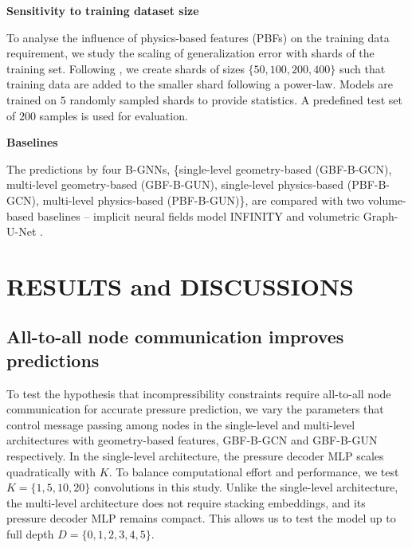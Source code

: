 \documentclass{marine_2025_paper_template}
\begin{document}
\noindent
\textbf{Sensitivity to training dataset size}

To analyse the influence of physics-based features (PBFs) on the training data requirement, we study the scaling of generalization error with shards of the training set. Following \cite{hestness2017}, we create shards of sizes $\{50, 100, 200, 400\}$ such that training data are added to the smaller shard following a power-law. Models are trained on $5$ randomly sampled shards to provide statistics. A predefined test set of $200$ samples is used for evaluation. \newline

\noindent\textbf{Baselines}

The predictions by four B-GNNs, \{single-level geometry-based (GBF-B-GCN), multi-level geometry-based (GBF-B-GUN), single-level physics-based (PBF-B-GCN), multi-level physics-based (PBF-B-GUN)\}, are compared with two volume-based baselines -- implicit neural fields model INFINITY \citep{serrano2023} and volumetric Graph-U-Net \citep{bonnet2023}.

\section{RESULTS and DISCUSSIONS}

\subsection{All-to-all node communication improves predictions}

\noindent To test the hypothesis that incompressibility constraints require all-to-all node communication for accurate pressure prediction, we vary the parameters that control message passing among nodes in the single-level and multi-level architectures with geometry-based features, GBF-B-GCN and GBF-B-GUN respectively. In the single-level architecture, the pressure decoder MLP scales quadratically with $K$. To balance computational effort and performance, we test $K=\{1, 5, 10, 20\}$ convolutions in this study. Unlike the single-level architecture, the multi-level architecture does not require stacking embeddings, and its pressure decoder MLP remains compact. This allows us to test the model up to full depth $D=\{0,1,2,3,4,5\}$.\newline
\end{document}

